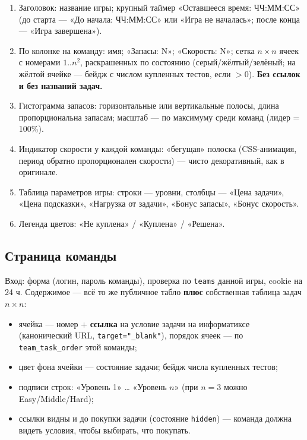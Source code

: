 \documentclass[12pt,a4paper]{article}
\newcommand{\field}[1]{\texttt{#1}}
\newcommand{\btn}[1]{«#1»}
\begin{document}
\begin{enumerate}[nosep]
  \item Заголовок: название игры; крупный таймер \btn{Оставшееся время:
        ЧЧ:ММ:СС} (до старта --- \btn{До начала: ЧЧ:ММ:СС} или
        \btn{Игра не началась}; после конца --- \btn{Игра завершена}).
  \item По колонке на команду: имя; \btn{Запасы: N}; \btn{Скорость: N};
        сетка $n \times n$ ячеек с номерами $1..n^2$, раскрашенных по
        состоянию (серый/жёлтый/зелёный; на жёлтой ячейке --- бейдж с числом
        купленных тестов, если $> 0$). \textbf{Без ссылок и без названий
        задач.}
  \item Гистограмма запасов: горизонтальные или вертикальные полосы,
        длина пропорциональна запасам; масштаб --- по максимуму среди команд
        (лидер = 100\%).
  \item Индикатор скорости у каждой команды: «бегущая» полоска
        (CSS-анимация, период обратно пропорционален скорости) --- чисто
        декоративный, как в оригинале.
  \item Таблица параметров игры: строки --- уровни, столбцы --- «Цена
        задачи», «Цена подсказки», «Нагрузка от задачи», «Бонус запасы»,
        «Бонус скорость».
  \item Легенда цветов: «Не куплена» / «Куплена» / «Решена».
\end{enumerate}

\subsection{Страница команды}

Вход: форма (логин, пароль команды), проверка по \field{teams} данной игры,
cookie на 24 ч. Содержимое --- всё то же публичное табло \textbf{плюс}
собственная таблица задач $n \times n$:

\begin{itemize}[nosep]
  \item ячейка --- номер + \textbf{ссылка} на условие задачи на информатиксе
        (канонический URL, \field{target="\_blank"}), порядок ячеек --- по
        \field{team\_task\_order} этой команды;
  \item цвет фона ячейки --- состояние задачи; бейдж числа купленных тестов;
  \item подписи строк: «Уровень 1» … «Уровень $n$» (при $n=3$ можно
        Easy/Middle/Hard);
  \item ссылки видны и до покупки задачи (состояние \field{hidden}) ---
        команда должна видеть условия, чтобы выбирать, что покупать.
\end{itemize}
\end{document}
